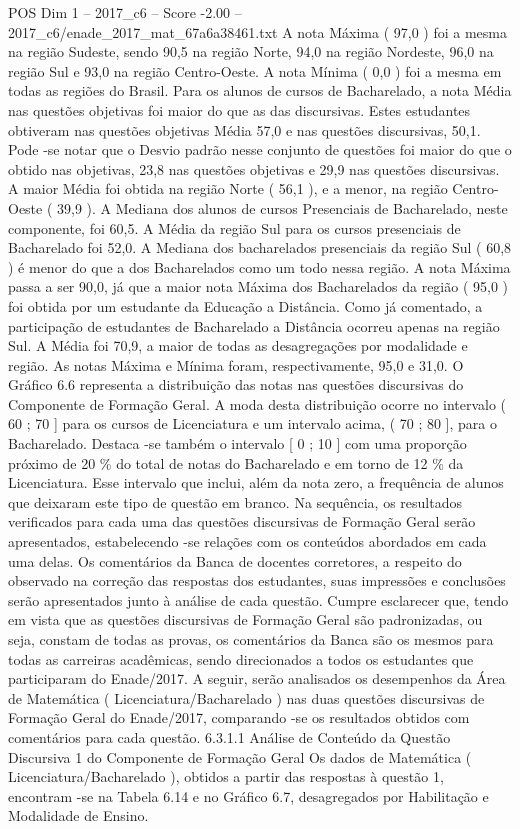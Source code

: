 \begin{textsample}{POS Dim 1 – 2017\_c6 – Score -2.00 – 2017\_c6/enade\_2017\_mat\_67a6a38461.txt}
A nota Máxima ( 97,0 ) foi a mesma na região Sudeste, sendo 90,5 na região Norte, 94,0 na região Nordeste, 96,0 na região Sul e 93,0 na região Centro-Oeste.
A nota Mínima ( 0,0 ) foi a mesma em todas as regiões do Brasil.
Para os alunos de cursos de Bacharelado, a nota Média nas questões objetivas foi maior do que as das discursivas.
Estes estudantes obtiveram nas questões objetivas Média 57,0 e nas questões discursivas, 50,1.
Pode -se notar que o Desvio padrão nesse conjunto de questões foi maior do que o obtido nas objetivas, 23,8 nas questões objetivas e 29,9 nas questões discursivas.
A maior Média foi obtida na região Norte ( 56,1 ), e a menor, na região Centro-Oeste ( 39,9 ).
A Mediana dos alunos de cursos Presenciais de Bacharelado, neste componente, foi 60,5.
A Média da região Sul para os cursos presenciais de Bacharelado foi 52,0.
A Mediana dos bacharelados presenciais da região Sul ( 60,8 ) é menor do que a dos Bacharelados como um todo nessa região.
A nota Máxima passa a ser 90,0, já que a maior nota Máxima dos Bacharelados da região ( 95,0 ) foi obtida por um estudante da Educação a Distância.
Como já comentado, a participação de estudantes de Bacharelado a Distância ocorreu apenas na região Sul.
A Média foi 70,9, a maior de todas as desagregações por modalidade e região.
As notas Máxima e Mínima foram, respectivamente, 95,0 e 31,0.
O Gráfico 6.6 representa a distribuição das notas nas questões discursivas do Componente de Formação Geral.
A moda desta distribuição ocorre no intervalo ( 60 ; 70 ] para os cursos de Licenciatura e um intervalo acima, ( 70 ; 80 ], para o Bacharelado.
Destaca -se também o intervalo [ 0 ; 10 ] com uma proporção próximo de 20 \% do total de notas do Bacharelado e em torno de 12 \% da Licenciatura.
Esse intervalo que inclui, além da nota zero, a frequência de alunos que deixaram este tipo de questão em branco.
Na sequência, os resultados verificados para cada uma das questões discursivas de Formação Geral serão apresentados, estabelecendo -se relações com os conteúdos abordados em cada uma delas.
Os comentários da Banca de docentes corretores, a respeito do observado na correção das respostas dos estudantes, suas impressões e conclusões serão apresentados junto à análise de cada questão.
Cumpre esclarecer que, tendo em vista que as questões discursivas de Formação Geral são padronizadas, ou seja, constam de todas as provas, os comentários da Banca são os mesmos para todas as carreiras acadêmicas, sendo direcionados a todos os estudantes que participaram do Enade/2017.
A seguir, serão analisados os desempenhos da Área de Matemática ( Licenciatura/Bacharelado ) nas duas questões discursivas de Formação Geral do Enade/2017, comparando -se os resultados obtidos com comentários para cada questão. 6.3.1.1 Análise de Conteúdo da Questão Discursiva 1 do Componente de Formação Geral Os dados de Matemática ( Licenciatura/Bacharelado ), obtidos a partir das respostas à questão 1, encontram -se na Tabela 6.14 e no Gráfico 6.7, desagregados por Habilitação e Modalidade de Ensino.

\end{textsample}
